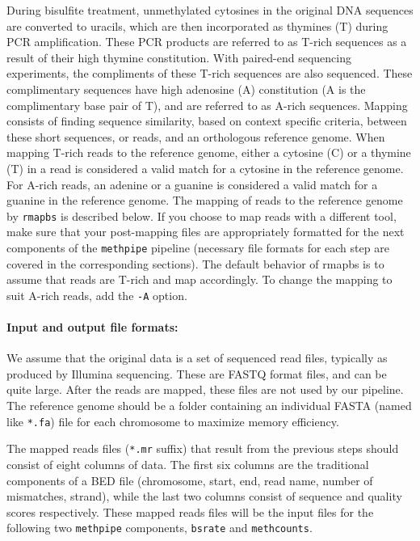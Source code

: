 \documentclass[10pt]{article}
\newcommand{\meth}{\texttt{methpipe}}
\newcommand{\prog}[1]{\texttt{#1}}
\newcommand{\fn}[1]{\texttt{#1}}
\newcommand{\op}[1]{\texttt{#1}}
\begin{document}

During bisulfite treatment, unmethylated cytosines in the original DNA
sequences are converted to uracils, which are then incorporated as
thymines (T) during PCR amplification. These PCR products are referred
to as T-rich sequences as a result of their high thymine
constitution. With paired-end sequencing experiments, the compliments
of these T-rich sequences are also sequenced.  These complimentary
sequences have high adenosine (A) constitution (A is the complimentary
base pair of T), and are referred to as A-rich sequences. Mapping
consists of finding sequence similarity, based on context specific
criteria, between these short sequences, or reads, and an orthologous
reference genome.  When mapping T-rich reads to the
reference genome, either a cytosine (C) or a thymine (T) in a read is
considered a valid match for a cytosine in the reference genome. For
A-rich reads, an adenine or a guanine is considered a valid match for
a guanine in the reference genome. The mapping of reads to the
reference genome by \prog{rmapbs} is described below. If you choose
to map reads with a different tool, make sure that your post-mapping
files are appropriately formatted for the next components of the
\meth{} pipeline (necessary file formats for each step are covered in
the corresponding sections).  The default behavior of rmapbs is to
assume that reads are T-rich and map accordingly. To change the
mapping to suit A-rich reads, add the \op{-A} option.

\paragraph{Input and output file formats:} We assume that the original
data is a set of sequenced read files, typically as produced by
Illumina sequencing. These are FASTQ format files, and can be quite
large. After the reads are mapped, these files are not used by our
pipeline.  The reference genome should be a folder containing an
individual FASTA (named like \fn{*.fa}) file for each chromosome to
maximize memory efficiency.

The mapped reads files (\fn{*.mr} suffix) that result from the
previous steps should consist of eight columns of data. The first six
columns are the traditional components of a BED file (chromosome,
start, end, read name, number of mismatches, strand), while the last
two columns consist of sequence and quality scores respectively. These
mapped reads files will be the input files for the following two
\meth{} components, \prog{bsrate} and \prog{methcounts}.
\end{document}
